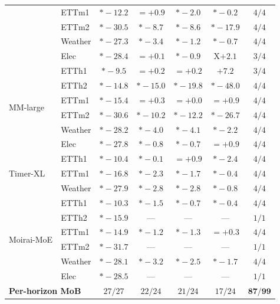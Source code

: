 \documentclass{article}
\begin{document}
\begin{table}[!htbp]
\begin{tabular}{@{}ll|cccc|c@{}}
                           & ETTm1   & $\mathbf{*{-}12.2}$ & $={+}0.9$ & $*{-}2.0$ & $*{-}0.2$ & $4/4$ \\
                           & ETTm2   & $\mathbf{*{-}30.5}$ & $\mathbf{*{-}8.7}$ & $\mathbf{*{-}8.6}$ & $*{-}17.9$ & $4/4$ \\
                           & Weather & $\mathbf{*{-}27.3}$ & $\mathbf{*{-}3.4}$ & $\mathbf{*{-}1.2}$ & $*{-}0.7$ & $4/4$ \\
                           & Elec    & $\mathbf{*{-}28.4}$ & $={+}0.1$ & $*{-}0.9$ & X${+}2.1$ & $3/4$ \\
\midrule
\multirow{6}{*}{MM-large} & ETTh1   & $\mathbf{*{-}9.5}$ & $={+}0.2$ & $={+}0.2$ & ${+}7.2$ & $3/4$ \\
                           & ETTh2   & $\mathbf{*{-}14.8}$ & $\mathbf{*{-}15.0}$ & $\mathbf{*{-}19.8}$ & $\mathbf{*{-}48.0}$ & $4/4$ \\
                           & ETTm1   & $\mathbf{*{-}15.4}$ & $={+}0.3$ & $={+}0.0$ & $={+}0.9$ & $4/4$ \\
                           & ETTm2   & $\mathbf{*{-}30.6}$ & $\mathbf{*{-}10.2}$ & $\mathbf{*{-}12.2}$ & $\mathbf{*{-}26.7}$ & $4/4$ \\
                           & Weather & $\mathbf{*{-}28.2}$ & $\mathbf{*{-}4.0}$ & $\mathbf{*{-}4.1}$ & $\mathbf{*{-}2.2}$ & $4/4$ \\
                           & Elec    & $\mathbf{*{-}27.8}$ & $\mathbf{*{-}0.8}$ & $*{-}0.7$ & $={+}0.9$ & $4/4$ \\
\midrule
\multirow{3}{*}{Timer-XL} & ETTh1   & $\mathbf{*{-}10.4}$ & $*{-}0.1$ & $={+}0.9$ & $*{-}2.4$ & $4/4$ \\
                           & ETTm1   & $\mathbf{*{-}16.8}$ & $\mathbf{*{-}2.3}$ & $*{-}1.7$ & $*{-}0.4$ & $4/4$ \\
                           & Weather & $\mathbf{*{-}27.9}$ & $\mathbf{*{-}2.8}$ & $\mathbf{*{-}2.8}$ & $*{-}0.8$ & $4/4$ \\
\midrule
\multirow{6}{*}{Moirai-MoE} & ETTh1 & $\mathbf{*{-}10.3}$ & $*{-}1.5$ & $*{-}0.7$ & $*{-}0.4$ & $4/4$ \\
                           & ETTh2   & $\mathbf{*{-}15.9}$ & --- & --- & --- & $1/1$ \\
                           & ETTm1   & $\mathbf{*{-}14.9}$ & $*{-}1.2$ & $*{-}1.3$ & $={+}0.3$ & $4/4$ \\
                           & ETTm2   & $\mathbf{*{-}31.7}$ & --- & --- & --- & $1/1$ \\
                           & Weather & $\mathbf{*{-}28.1}$ & $\mathbf{*{-}3.2}$ & $\mathbf{*{-}2.5}$ & $\mathbf{*{-}1.7}$ & $4/4$ \\
                           & Elec    & $\mathbf{*{-}28.5}$ & --- & --- & --- & $1/1$ \\
\midrule
\multicolumn{2}{l|}{\textbf{Per-horizon MoB}} & $27/27$ & $22/24$ & $21/24$ & $17/24$ & $\mathbf{87/99}$ \\
\bottomrule
\end{tabular}
\end{table}
\end{document}
